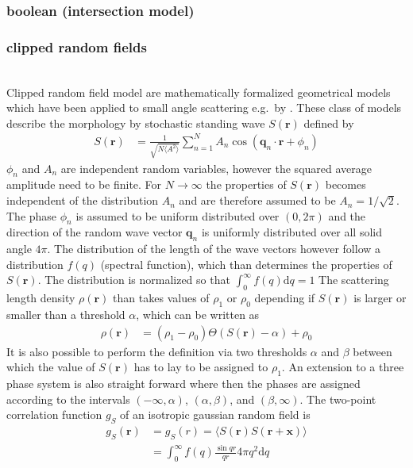 \newpage
\subsubsection{boolean (intersection model)}

\newpage
\subsubsection{clipped random fields} ~\\

Clipped random field model are mathematically formalized geometrical models which have been applied to small angle scattering e.g.\ by \cite{Berk1991,Teubner1991,Levitz1998,Roberts1995}. These class of models describe the morphology by stochastic standing wave $S(\mathbf{r})$ defined by
\begin{align}
S(\mathbf{r}) &= \frac{1}{\sqrt{N\langle A^2\rangle}} \sum_{n=1}^N A_n \cos\left(\mathbf{q}_n\cdot\mathbf{r}+\phi_n\right)
\end{align}
$\phi_n$ and $A_n$ are independent random variables, however the squared average amplitude need to be finite. For $N\rightarrow \infty$ the properties of $S(\mathbf{r})$ becomes independent of the distribution $A_n$ and are therefore assumed to be $A_n=1/\sqrt{2}$. The phase $\phi_n$ is assumed to be uniform distributed over $(0,2\pi)$ and the direction of the random wave vector $\mathbf{q}_n$ is uniformly distributed over all solid angle $4\pi$. The distribution of the length of the wave vectors however follow a distribution $f(q)$ (spectral function), which than determines the properties of $S(\mathbf{r})$. The distribution is normalized so that $\int_0^\infty f(q) \mathrm{d}q=1$ The scattering length density $\rho(\mathbf{r})$ than takes values of $\rho_1$ or $\rho_0$ depending if $S(\mathbf{r})$ is larger or smaller than a threshold $\alpha$, which can be written as
\begin{align}
  \rho(\mathbf{r}) & = (\rho_1-\rho_0) \Theta(S(\mathbf{r})-\alpha) + \rho_0
\end{align}
It is also possible to perform the definition via two thresholds $\alpha$ and $\beta$ between which the value of $S(\mathbf{r})$ has to lay to be assigned to $\rho_1$. An extension to a three phase system is also straight forward where then the phases are assigned according to the intervals $(-\infty,\alpha)$, $(\alpha,\beta)$, and $(\beta,\infty)$.
The two-point correlation function $g_S$ of an isotropic gaussian random field is
\begin{align}\label{eq:gr_CGRF}
  g_S(\mathbf{r}) &= g_S(r) = \langle S(\mathbf{r}) S(\mathbf{r}+\mathbf{x}) \rangle \\
                  &= \int_0^\infty f(q) \frac{\sin qr}{qr} 4\pi q^2 \mathrm{d}q
\end{align}

